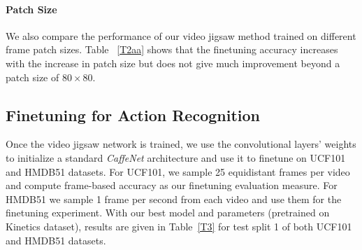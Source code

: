 \documentclass[10pt,twocolumn,letterpaper]{article}
\begin{document}
\vspace{-3mm}
\paragraph{\textbf{Patch Size}}
We also compare the performance of our video jigsaw method trained on different frame patch sizes. Table ~\ref{T2aa} shows that the finetuning accuracy increases with the increase in patch size but does not give much improvement beyond a patch size of $80 \times 80$. 

\begin{table}[t]
\centering
{}
\caption{As we increase patch size, the video jigsaw finetuning accuracy on UCF101 dataset increases}
\label{T2aa}
\end{table}

\subsection{\textbf{Finetuning for Action Recognition}}
Once the video jigsaw network is trained, we use the convolutional layers' weights to initialize a standard \textit{CaffeNet} \cite{krizhevsky2012imagenet} architecture and use it to finetune on UCF101 and HMDB51 datasets. For UCF101, we sample 25 equidistant frames per video and compute frame-based accuracy as our finetuning evaluation measure. For HMDB51 we sample 1 frame per second from each video and use them for the finetuning experiment. With our best model and parameters (pretrained on Kinetics dataset), results are given in Table~\ref{T3} for test split 1 of both UCF101 and HMDB51 datasets.  
\end{document}
